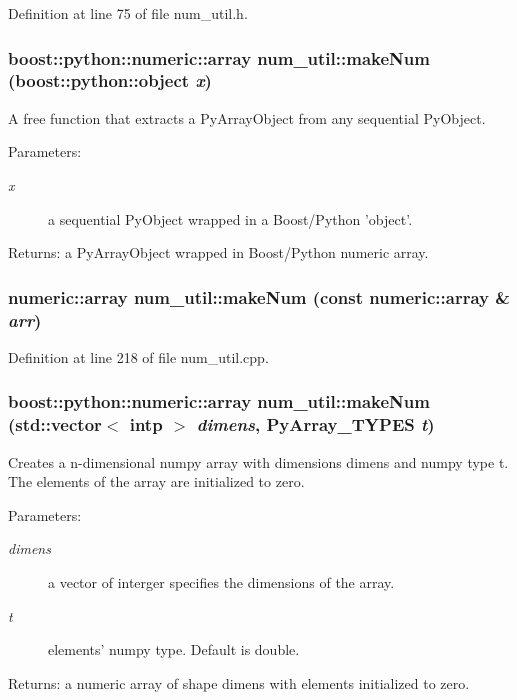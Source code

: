Definition at line 75 of file num\_\-util.h.
\subsubsection{\setlength{\rightskip}{0pt plus 5cm}boost::python::numeric::array num\_\-util::make\-Num (boost::python::object {\em x})}\label{namespacenum__util_a60}


A free function that extracts a Py\-Array\-Object from any sequential Py\-Object. \begin{Desc}
\item[Parameters:]
\begin{description}
\item[{\em x}]a sequential Py\-Object wrapped in a Boost/Python 'object'. \end{description}
\end{Desc}
\begin{Desc}
\item[Returns:]a Py\-Array\-Object wrapped in Boost/Python numeric array.\end{Desc}
\subsubsection{\setlength{\rightskip}{0pt plus 5cm}numeric::array num\_\-util::make\-Num (const numeric::array \& {\em arr})}\label{namespacenum__util_a35}




Definition at line 218 of file num\_\-util.cpp.
\subsubsection{\setlength{\rightskip}{0pt plus 5cm}boost::python::numeric::array num\_\-util::make\-Num (std::vector$<$ intp $>$ {\em dimens}, Py\-Array\_\-TYPES {\em t})}\label{namespacenum__util_a34}


Creates a n-dimensional numpy array with dimensions dimens and numpy type t. The elements of the array are initialized to zero. \begin{Desc}
\item[Parameters:]
\begin{description}
\item[{\em dimens}]a vector of interger specifies the dimensions of the array. \item[{\em t}]elements' numpy type. Default is double. \end{description}
\end{Desc}
\begin{Desc}
\item[Returns:]a numeric array of shape dimens with elements initialized to zero.\end{Desc}


